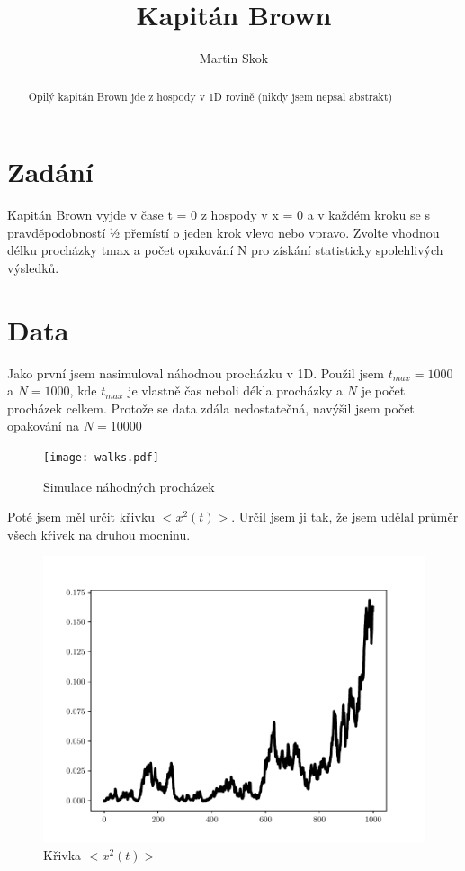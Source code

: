 \documentclass{article}
\title{Kapitán Brown}
\author{Martin Skok}
\begin{document}
\maketitle

\begin{abstract}
  Opilý kapitán Brown jde z hospody v 1D rovině (nikdy jsem nepsal abstrakt)
\end{abstract}

\section{Zadání}
Kapitán Brown vyjde v čase t = 0 z hospody v x = 0 a v každém kroku se s
pravděpodobností ½ přemístí o jeden krok vlevo nebo vpravo.
Zvolte vhodnou délku procházky tmax a počet opakování N pro získání statisticky
spolehlivých výsledků.\\
\newpage
\section{Data}
Jako první jsem nasimuloval náhodnou procházku v 1D. Použil jsem $t_{max} = 1000$
a $N = 1000$, kde $t_{max}$ je vlastně čas neboli dékla procházky a $N$ je počet procházek celkem.
Protože se data zdála nedostatečná, navýšil jsem počet opakování na $N = 10000$

\begin{figure}[hbt!]
  \begin{center}
    \texttt{[image: walks.pdf]}
    \end{center}
  \caption{Simulace náhodných procházek}
\end{figure}
\newpage

Poté jsem měl určit křivku $<x^{2} (t)>$.
Určil jsem ji tak, že jsem udělal průměr všech křivek na druhou mocninu.

\begin{figure}[hbt!]
  \begin{center}
    \includegraphics[scale=0.7]{walks2.pdf}
    \end{center}
  \caption{Křivka $<x^{2} (t)>$}
\end{figure}
\end{document}
